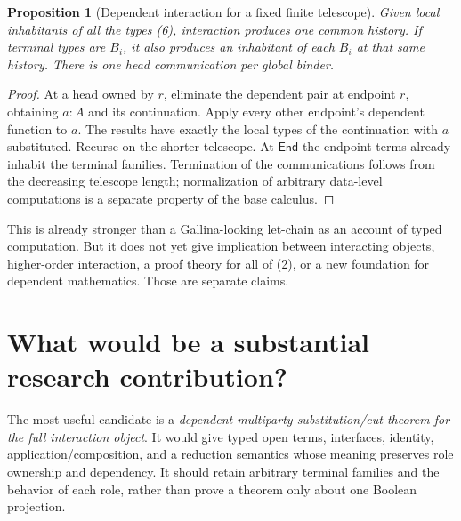 \documentclass[11pt]{article}
\newtheorem{proposition}{Proposition}
\newcommand{\End}{\mathsf{End}}
\begin{document}
\begin{proposition}[Dependent interaction for a fixed finite telescope]
Given local inhabitants of all the types (6), interaction produces one common
history. If terminal types are $B_i$, it also produces an inhabitant of each
$B_i$ at that same history. There is one head communication per global binder.
\end{proposition}
\begin{proof}
At a head owned by $r$, eliminate the dependent pair at endpoint $r$, obtaining
$a:A$ and its continuation. Apply every other endpoint's dependent function to
$a$. The results have exactly the local types of the continuation with $a$
substituted. Recurse on the shorter telescope. At $\End$ the endpoint terms
already inhabit the terminal families. Termination of the communications follows
from the decreasing telescope length; normalization of arbitrary data-level
computations is a separate property of the base calculus.
\end{proof}

This is already stronger than a Gallina-looking let-chain as an account of
typed computation. But it does not yet give implication between interacting
objects, higher-order interaction, a proof theory for all of (2), or a new
foundation for dependent mathematics. Those are separate claims.

\section{What would be a substantial research contribution?}

The most useful candidate is a \emph{dependent multiparty substitution/cut
theorem for the full interaction object}. It would give typed open terms,
interfaces, identity, application/composition, and a reduction semantics whose
meaning preserves role ownership and dependency. It should retain arbitrary
terminal families and the behavior of each role, rather than prove a theorem
only about one Boolean projection.
\end{document}
